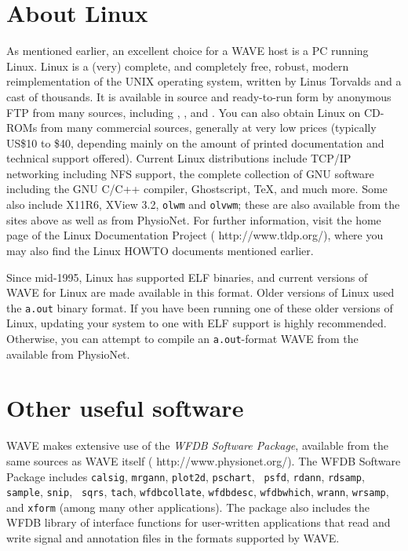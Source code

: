 \documentclass[twoside]{book}
\newcommand{\WAVE}{{\sf WAVE}\xspace}
\begin{document}
\section{About Linux}

\label{sec:linux}
As mentioned earlier, an excellent choice for a \WAVE{}
host is a PC running Linux.  Linux is a (very) complete, and
completely free, robust, modern reimplementation of the UNIX operating
system, written by Linus Torvalds and a cast of thousands.  It is
available in source and ready-to-run form by anonymous FTP from many
sources, including
,
, and
.
You can also obtain Linux on CD-ROMs from many
commercial sources, generally at very low prices (typically US\$10 to
\$40, depending mainly on the amount of printed documentation and
technical support offered).  Current Linux distributions include
TCP/IP networking including NFS
support, the complete collection of GNU software including the GNU
C/C++ compiler, Ghostscript, \TeX, and much more.  Some also include
X11R6, XView 3.2, {\tt olwm} and {\tt olvwm};  these are also available
from the sites above as well as from PhysioNet.  For further
information, visit the home page of the Linux Documentation Project
(
{http://www.tldp.org/}), where you may also find the Linux HOWTO
documents mentioned earlier.

Since mid-1995, Linux has supported ELF binaries, and current versions
of \WAVE{} for Linux are made available in this format.  Older
versions of Linux used the {\tt a.out} binary format.  If you have
been running one of these older versions of Linux, updating your system
to one with ELF support is highly recommended.  Otherwise, you can attempt
to compile an {\tt a.out}-format WAVE from the
available from PhysioNet.

\section{Other useful software}
\label{sec:other-software}

\WAVE{} makes extensive use of the \emph{WFDB Software Package}, available from
the same sources as \WAVE{} itself
(
{http://www.physionet.org/}).  The WFDB Software Package includes
{\tt calsig}, {\tt mrgann}, {\tt plot2d}, {\tt pschart}, {\tt
psfd}, {\tt rdann}, {\tt rdsamp}, {\tt sample}, {\tt snip}, {\tt
sqrs}, {\tt tach}, {\tt wfdbcollate}, {\tt wfdbdesc}, {\tt wfdbwhich},
{\tt wrann}, {\tt wrsamp}, and {\tt xform} (among many other applications).
The package also includes the WFDB library of interface functions for
user-written applications that read and write signal and annotation
files in the formats supported by \WAVE{}.
\end{document}
